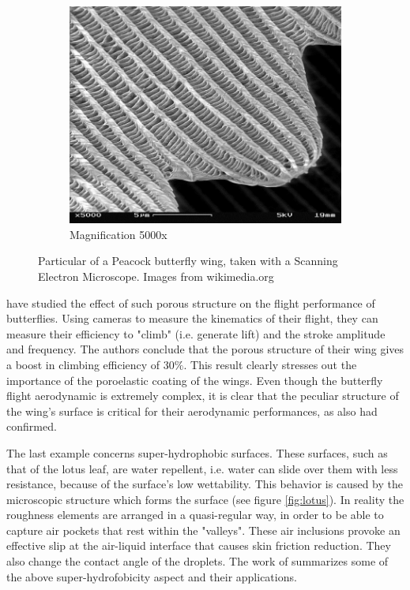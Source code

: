 \begin{figure}[h]
\begin{subfigure}[b]{0.3\textwidth}
	\end{subfigure}
	\begin{subfigure}[b]{0.3\textwidth}
		\includegraphics[width=\textwidth]{chapter_1/butterfly3}
		\caption{Magnification 5000x}
		\label{fig:b5000}
	\end{subfigure}
	\caption{Particular of a Peacock butterfly wing, taken with a Scanning Electron Microscope. Images from wikimedia.org}
	\label{fig:butterfly}
\end{figure}

\citet{slegers2017beneficial} have studied the effect of such porous structure on the flight performance of butterflies.
Using cameras to measure the kinematics of their flight, they can measure their efficiency to "climb" (i.e. generate lift) and the stroke amplitude and frequency.
The authors conclude that the porous structure of their wing gives a boost in climbing efficiency of $30\%$. This result clearly stresses out the importance of the poroelastic coating of the wings. 
Even though the butterfly flight aerodynamic is extremely complex, it is clear that the peculiar structure of the wing's surface is critical for their aerodynamic performances, as also \citet{srygley2002unconventional} had confirmed.

The last example concerns super-hydrophobic surfaces. These surfaces, such as that of the lotus leaf, are water repellent, i.e. water can slide over them with less resistance, because of the surface's low wettability.
This behavior is caused by the microscopic structure which forms the surface (see figure \ref{fig:lotus}). In reality the roughness elements are arranged in a quasi-regular way, in order to be able to capture air pockets that rest within the "valleys". These air inclusions provoke an effective slip at the air-liquid interface that causes skin friction reduction. They also change the contact angle of the droplets. The work of \citet{bottaro2003effect} summarizes some of the above super-hydrofobicity aspect and their applications.

